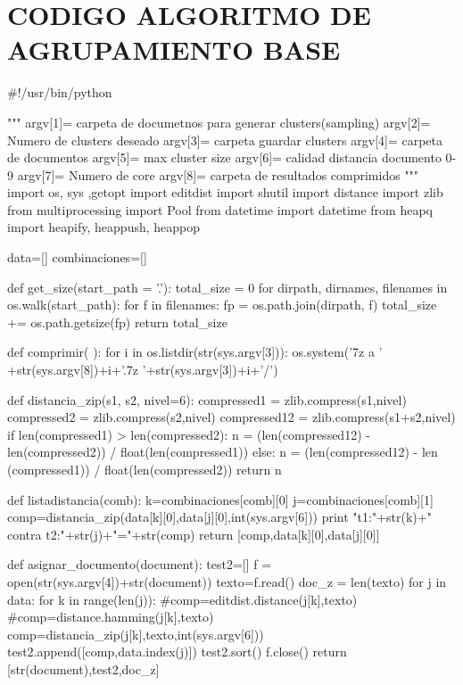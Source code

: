 


\chapter{CODIGO ALGORITMO DE AGRUPAMIENTO BASE}
\label{ch:Codigo Metodo de agrupación propuesto}



\begin{python}





#!/usr/bin/python

""" argv[1]= carpeta de documetnos para generar clusters(sampling)
	argv[2]= Numero de clusters deseado
	argv[3]= carpeta guardar clusters
	argv[4]= carpeta de documentos
	argv[5]= max cluster size
	argv[6]= calidad distancia documento 0-9
	argv[7]= Numero de core
	argv[8]= carpeta de resultados comprimidos
"""
import os, sys ,getopt
import editdist
import shutil
import distance
import zlib
from multiprocessing import Pool
from datetime import datetime
from heapq import heapify, heappush, heappop

data=[] 
combinaciones=[]


def get_size(start_path = '.'):
    total_size = 0
    for dirpath, dirnames, filenames in os.walk(start_path):
        for f in filenames:
            fp = os.path.join(dirpath, f)
            total_size += os.path.getsize(fp)
    return total_size

def comprimir( ):
	for i in os.listdir(str(sys.argv[3])):
		os.system('7z a ' +str(sys.argv[8])+i+'.7z '+str(sys.argv[3])+i+'/')
		
	
def distancia_zip(s1, s2, nivel=6):
	compressed1 = zlib.compress(s1,nivel)
	compressed2 = zlib.compress(s2,nivel)
	compressed12 = zlib.compress(s1+s2,nivel)
	if len(compressed1) > len(compressed2):
		n = (len(compressed12) - len(compressed2)) / float(len(compressed1))
	else:
		n = (len(compressed12) - len (compressed1)) / float(len(compressed2))	
	return n

def listadistancia(comb):
	k=combinaciones[comb][0]
	j=combinaciones[comb][1]
	comp=distancia_zip(data[k][0],data[j][0],int(sys.argv[6]))
	print "t1:"+str(k)+" contra t2:"+str(j)+"="+str(comp)
	return [comp,data[k][0],data[j][0]]		
	
def asignar_documento(document):
	test2=[]
	f = open(str(sys.argv[4])+str(document))		
	texto=f.read()
	doc_z = len(texto)
	for j in data:
		for k in range(len(j)):
			#comp=editdist.distance(j[k],texto)
			#comp=distance.hamming(j[k],texto)	
			comp=distancia_zip(j[k],texto,int(sys.argv[6]))	
			test2.append([comp,data.index(j)])	          
	test2.sort()
	f.close()
	return [str(document),test2,doc_z]	


\end{python}
